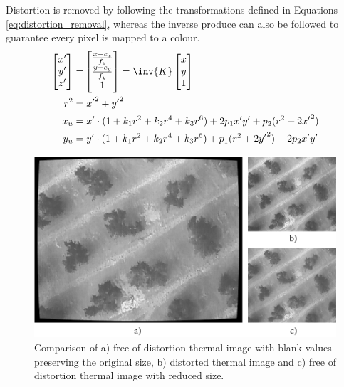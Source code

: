 Distortion is removed by following the transformations defined in Equations \ref{eq:distortion_removal}, whereas the inverse produce can also be followed to guarantee every pixel is mapped to a colour.
\begin{gather}
    \label{eq:distortion_removal}
    \begin{aligned}
    \begin{bmatrix} 
        x'\\y'\\ z'
    \end{bmatrix}
    =& 
    \begin{bmatrix}
        \frac{x - c_x}{f_x}\\\frac{y - c_y}{f_y}\\ 1
    \end{bmatrix}
    = 
    \inv{K} \begin{bmatrix}
        x\\ y\\ 1
    \end{bmatrix}\\
    r^2 =& \hspace{1mm} {x'}^2 + {y'}^2\\
    x_u =& \hspace{1mm} x' \cdot (1 + k_1r^2 + k_2r^4 + k_3r^6) + 2p_1{x'}{y'} + p_2(r^2 + 2{x'}^2)\\
    y_u =& \hspace{1mm} y' \cdot (1 + k_1r^2 + k_2r^4 + k_3r^6) + p_1(r^2 + 2{y'}^2) +2p_2{x'}{y'}
    \end{aligned}
\end{gather}

\begin{figure}[hbt]
	\centering
	\includegraphics[width=\linewidth]{figs/materials/thermal_distortion_2.png}
	\caption{Comparison of a) free of distortion thermal image with blank values preserving the original size, b) distorted thermal image and c) free of distortion thermal image with reduced size.}
	\label{fig:thermal_undistortion}
\end{figure}

